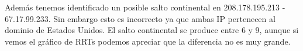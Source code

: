 Además tenemos identificado un posible salto continental en 208.178.195.213 - 67.17.99.233. Sin embargo esto
es incorrecto ya que ambas IP pertenecen al dominio de Estados Unidos. El salto continental se produce entre
6 y 9, aunque si vemos el gráfico de RRTs podemos apreciar que la diferencia no es muy grande.
